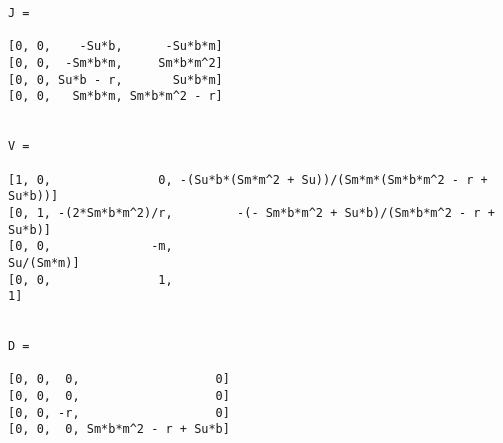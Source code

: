 \documentclass[11pt]{article}
\begin{document}
        \color{brown} \begin{verbatim}
J =

[0, 0,    -Su*b,      -Su*b*m]
[0, 0,  -Sm*b*m,     Sm*b*m^2]
[0, 0, Su*b - r,       Su*b*m]
[0, 0,   Sm*b*m, Sm*b*m^2 - r]


V =

[1, 0,               0, -(Su*b*(Sm*m^2 + Su))/(Sm*m*(Sm*b*m^2 - r + Su*b))]
[0, 1, -(2*Sm*b*m^2)/r,         -(- Sm*b*m^2 + Su*b)/(Sm*b*m^2 - r + Su*b)]
[0, 0,              -m,                                          Su/(Sm*m)]
[0, 0,               1,                                                  1]


D =

[0, 0,  0,                   0]
[0, 0,  0,                   0]
[0, 0, -r,                   0]
[0, 0,  0, Sm*b*m^2 - r + Su*b]

\end{verbatim} \color{black}
\end{document}
